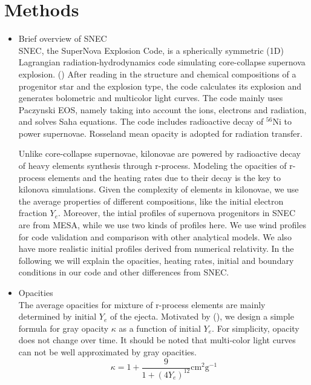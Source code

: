 \documentclass[fleqn,usenatbib]{mnras}
\begin{document}
\section{Methods}
\begin{itemize}
    \item Brief overview of SNEC\\
    SNEC, the SuperNova Explosion Code, is a spherically symmetric (1D) Lagrangian radiation-hydrodynamics code simulating core-collapse supernova explosion. (\cite{morozova2015light}) After reading in the structure and chemical compositions of a progenitor star and the explosion type, the code calculates its explosion and generates bolometric and multicolor light curves. The code mainly uses Paczynski EOS, namely taking into account the ions, electrons and radiation, and solves Saha equations. The code includes radioactive decay of $^{56}$Ni to power supernovae. Rosseland mean opacity is adopted for radiation transfer. 
    
    Unlike core-collapse supernovae, kilonovae are powered by radioactive decay of heavy elements synthesis through r-process. Modeling the opacities of r-process elements and the heating rates due to their decay is the key to kilonova simulations. Given the complexity of elements in kilonovae, we use the average properties of different compositions, like the initial electron fraction $Y_e$. Moreover, the intial profiles of supernova progenitors in SNEC are from MESA, while we use two kinds of profiles here. We use wind profiles for code validation and comparison with other analytical models. We also have more realistic initial profiles derived from numerical relativity. In the following we will explain the opacities, heating rates, initial and boundary conditions in our code and other differences from SNEC.
    

    \item Opacities\\
    The average opacities for mixture of r-process elements are mainly determined by initial $Y_e$ of the ejecta. Motivated by (\cite{tanaka2018properties}), we design a simple formula for gray opacity $\kappa$ as a function of initial $Y_e$. For simplicity, opacity does not change over time. It should be noted that multi-color light curves can not be well approximated by gray opacities.
    \begin{equation}
    	\label{opacity_ye}
    	\kappa = 1 + \frac{9}{1+(4Y_e)^{12}} \mathrm{ cm^2 g^{-1}}
    \end{equation}
    

\end{itemize}
\end{document}

